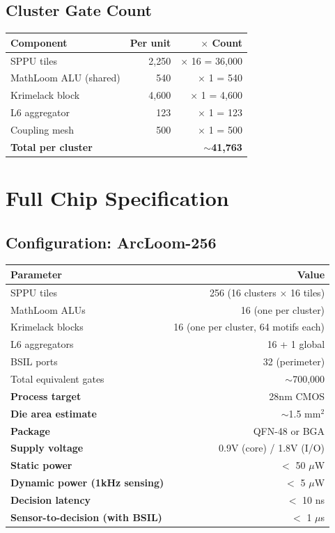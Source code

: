 \documentclass[11pt, a4paper]{article}
\begin{document}
\subsection{Cluster Gate Count}

\begin{center}
\begin{tabular}{@{}lrr@{}}
\toprule
\textbf{Component} & \textbf{Per unit} & \textbf{$\times$ Count} \\
\midrule
SPPU tiles & 2,250 & $\times$ 16 = 36,000 \\
MathLoom ALU (shared) & 540 & $\times$ 1 = 540 \\
Krimelack block & 4,600 & $\times$ 1 = 4,600 \\
L6 aggregator & 123 & $\times$ 1 = 123 \\
Coupling mesh & 500 & $\times$ 1 = 500 \\
\midrule
\textbf{Total per cluster} & & \textbf{$\sim$41,763} \\
\bottomrule
\end{tabular}
\end{center}

\section{Full Chip Specification}

\subsection{Configuration: ArcLoom-256}

\begin{center}
\begin{tabular}{@{}lr@{}}
\toprule
\textbf{Parameter} & \textbf{Value} \\
\midrule
SPPU tiles & 256 (16 clusters $\times$ 16 tiles) \\
MathLoom ALUs & 16 (one per cluster) \\
Krimelack blocks & 16 (one per cluster, 64 motifs each) \\
L6 aggregators & 16 + 1 global \\
BSIL ports & 32 (perimeter) \\
Total equivalent gates & $\sim$700,000 \\
\midrule
\textbf{Process target} & 28nm CMOS \\
\textbf{Die area estimate} & $\sim$1.5 mm$^2$ \\
\textbf{Package} & QFN-48 or BGA \\
\textbf{Supply voltage} & 0.9V (core) / 1.8V (I/O) \\
\textbf{Static power} & $<$ 50 $\mu$W \\
\textbf{Dynamic power (1kHz sensing)} & $<$ 5 $\mu$W \\
\textbf{Decision latency} & $<$ 10 ns \\
\textbf{Sensor-to-decision (with BSIL)} & $<$ 1 $\mu$s \\
\bottomrule
\end{tabular}
\end{center}
\end{document}
